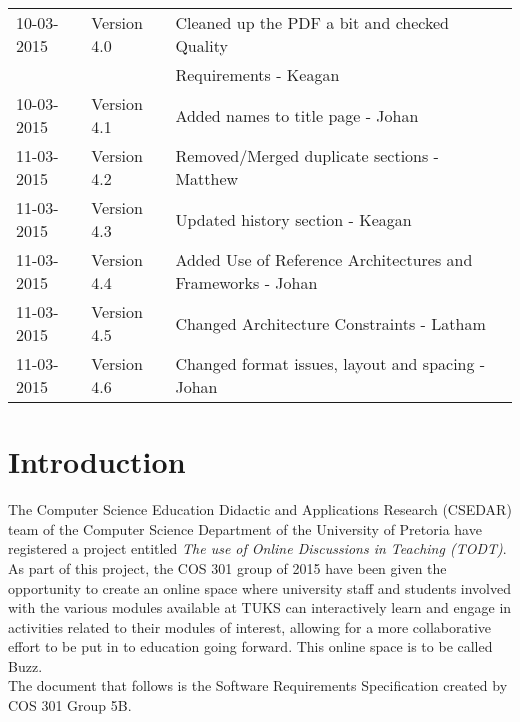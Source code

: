 \documentclass[hidelinks, 12pt]{article}
\begin{document}
\begin{tabular}{|l|l|l|}
\hline
10-03-2015 & Version 4.0 & Cleaned up the PDF a bit and checked Quality \\&&Requirements - Keagan\\
\hline
10-03-2015 & Version 4.1 & Added names to title page - Johan\\
\hline
11-03-2015 & Version 4.2 & Removed/Merged duplicate sections - Matthew\\
\hline
11-03-2015 & Version 4.3 & Updated history section - Keagan\\
\hline
11-03-2015 & Version 4.4 & Added Use of Reference Architectures and Frameworks - Johan\\
\hline
11-03-2015 & Version 4.5 & Changed Architecture Constraints - Latham\\
\hline
11-03-2015 & Version 4.6 & Changed format issues, layout and spacing - Johan\\
\hline



\end{tabular}

\newpage
\tableofcontents
\newpage

\section{Introduction}
The Computer Science Education Didactic and Applications Research (CSEDAR) team of the Computer Science Department of the University of Pretoria have registered a project entitled \emph{The use of Online Discussions in Teaching (TODT)}.\\ 
As part of this project, the COS 301 group of 2015 have been given the opportunity to create an online space where university staff and students involved with the various modules available at TUKS can interactively learn and engage in activities related to their modules of interest, allowing for a more collaborative effort to be put in to education going forward. This online space is to be called Buzz.\\
The document that follows is the Software Requirements Specification created by COS 301 Group 5B.
\end{document}
